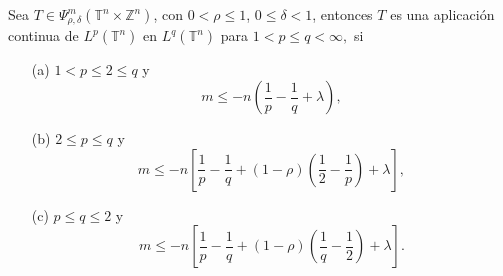 \begin{theorem}
	Sea $T \in \Psi^m_{\rho, \delta}(\mathbb{T}^n \times \mathbb{Z}^n) $, con $0 < \rho \leq 1$, $0 \leq \delta < 1$, entonces $T$ es una aplicación continua de $L^p(\mathbb{T}^n)$ en $L^q(\mathbb{T}^n)$ para $1<p\leq q<\infty,$ si 
	\begin{itemize}
		\item[(a)]  $1<p\leq 2\leq q$ y 
		\begin{equation}
			m\leq -n \left( \frac{1}{p} - \frac{1}{q} + \lambda \right),
			\label{eq:cotas-Lp-Lq-a}
		\end{equation}
		\item[(b)]  $2\leq p \leq q$ y 
		\begin{equation}
			m \leq -n \left[ \frac{1}{p} - \frac{1}{q} + (1-\rho)\left(\frac{1}{2} - \frac{1}{p}\right) + \lambda \right],
			\label{eq:cotas-Lp-Lq-b}
		\end{equation}
		\item[(c)]  $p\leq q\leq 2$ y  
		\begin{equation}
			m \leq -n \left[ \frac{1}{p} - \frac{1}{q} + (1-\rho)\left(\frac{1}{q} - \frac{1}{2}\right) + \lambda \right].
			\label{eq:cotas-Lp-Lq-c}
		\end{equation}
	\end{itemize}
	\label{teo:cotas-Lp-Lq}
\end{theorem}
